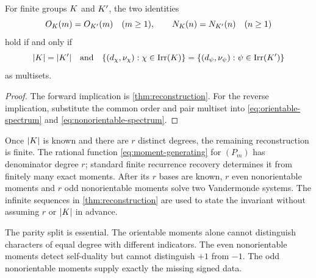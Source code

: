 \begin{corollary}
\label{cor:spectral-equivalence}
For finite groups $K$ and $K'$, the two identities
\[
 O_{K}(m)=O_{K'}(m)\quad(m\geq1),\qquad
 N_{K}(n)=N_{K'}(n)\quad(n\geq1)
\]
hold if and only if
\[
 |K|=|K'|
 \quad\text{and}\quad
 \{(d_\chi,\nu_\chi):\chi\in\operatorname{Irr}(K)\}
 =\{(d_\psi,\nu_\psi):\psi\in\operatorname{Irr}(K')\}
\]
as multisets.
\end{corollary}

\begin{proof}
The forward implication is \cref{thm:reconstruction}.  For the reverse
implication, substitute the common order and pair multiset into
\eqref{eq:orientable-spectrum} and \eqref{eq:nonorientable-spectrum}.
\end{proof}

\begin{remark}
\label{rem:finite-recovery}
Once $|K|$ is known and there are $r$ distinct degrees, the remaining
reconstruction is finite.  The rational function
\eqref{eq:moment-generating} for $(P_m)$ has denominator degree $r$; standard
finite recurrence recovery determines it from finitely many exact moments.
After its $r$ bases are known, $r$ even nonorientable moments and $r$ odd
nonorientable moments solve two Vandermonde systems.  The infinite sequences
in \cref{thm:reconstruction} are used to state the invariant without assuming
$r$ or $|K|$ in advance.
\end{remark}

The parity split is essential.  The orientable moments alone cannot distinguish
characters of equal degree with different indicators.  The even
nonorientable moments detect self-duality but cannot distinguish $+1$ from
$-1$.  The odd nonorientable moments supply exactly the missing signed data.
